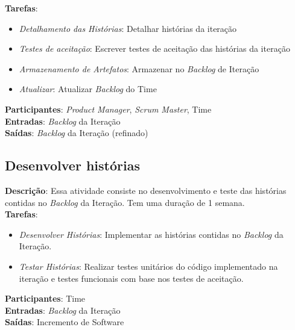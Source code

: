   \textbf{Tarefas}:
  \begin{itemize}
   \item \indent \textit{Detalhamento das Histórias}: Detalhar histórias da iteração
   
   \item \indent \textit{Testes de aceitação}: Escrever testes de aceitação das histórias da iteração

   \item \indent \textit{Armazenamento de Artefatos}: Armazenar no \textit{Backlog} de Iteração

   \item \indent \textit{Atualizar}: Atualizar \textit{Backlog} do Time
  \end{itemize}

  \textbf{Participantes}: \textit{Product Manager}, \textit{Scrum Master}, Time\\

  \textbf{Entradas}: \textit{Backlog} da Iteração \\

  \textbf{Saídas}:   \textit{Backlog} da Iteração (refinado)\\

\subsection{Desenvolver histórias}
  \textbf{Descrição}: Essa atividade consiste no desenvolvimento e teste das histórias contidas no \textit{Backlog} da Iteração. Tem uma duração de 1 semana. \\

  \textbf{Tarefas}:

  \begin{itemize}
    \item \indent \textit{Desenvolver Histórias}: Implementar as histórias contidas no \textit{Backlog} da Iteração.

   \item \indent \textit{Testar Histórias}: Realizar testes unitários do código implementado na iteração e testes funcionais
   com base nos testes de aceitação.
  \end{itemize}

  \textbf{Participantes}: Time\\

  \textbf{Entradas}: \textit{Backlog} da Iteração \\

  \textbf{Saídas}:   Incremento de Software\\

